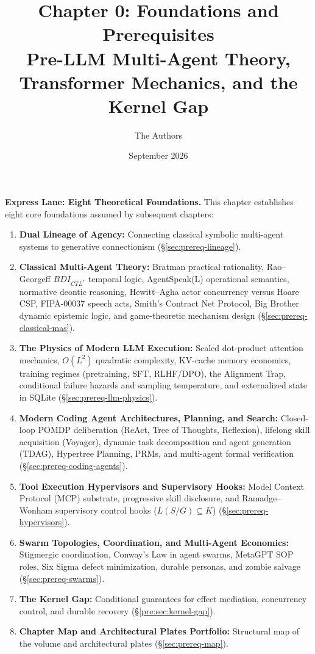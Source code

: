 \documentclass[11pt,a4paper]{article}
\title{\textbf{Chapter 0: Foundations and Prerequisites}\\
\large Pre-LLM Multi-Agent Theory, Transformer Mechanics, and the Kernel Gap}
\author{The Authors}
\date{September 2026}
\begin{document}
\maketitle


\noindent\textbf{Express Lane: Eight Theoretical Foundations.} This chapter establishes eight core foundations assumed by subsequent chapters:
\begin{enumerate}[leftmargin=1.8em,itemsep=3pt]
  \item \textbf{Dual Lineage of Agency:} Connecting classical symbolic multi-agent systems to generative connectionism (\S\ref{sec:prereq-lineage}).
  \item \textbf{Classical Multi-Agent Theory:} Bratman practical rationality, Rao--Georgeff $BDI_{CTL^*}$ temporal logic, AgentSpeak(L) operational semantics, normative deontic reasoning, Hewitt--Agha actor concurrency versus Hoare CSP, FIPA-00037 speech acts, Smith's Contract Net Protocol, Big Brother dynamic epistemic logic, and game-theoretic mechanism design (\S\ref{sec:prereq-classical-mas}).
  \item \textbf{The Physics of Modern LLM Execution:} Scaled dot-product attention mechanics, $O(L^2)$ quadratic complexity, KV-cache memory economics, training regimes (pretraining, SFT, RLHF/DPO), the Alignment Trap, conditional failure hazards and sampling temperature, and externalized state in SQLite (\S\ref{sec:prereq-llm-physics}).
  \item \textbf{Modern Coding Agent Architectures, Planning, and Search:} Closed-loop POMDP deliberation (ReAct, Tree of Thoughts, Reflexion), lifelong skill acquisition (Voyager), dynamic task decomposition and agent generation (TDAG), Hypertree Planning, PRMs, and multi-agent formal verification (\S\ref{sec:prereq-coding-agents}).
  \item \textbf{Tool Execution Hypervisors and Supervisory Hooks:} Model Context Protocol (MCP) substrate, progressive skill disclosure, and Ramadge--Wonham supervisory control hooks ($L(S/G) \subseteq K$) (\S\ref{sec:prereq-hypervisors}).
  \item \textbf{Swarm Topologies, Coordination, and Multi-Agent Economics:} Stigmergic coordination, Conway's Law in agent swarms, MetaGPT SOP roles, Six Sigma defect minimization, durable personas, and zombie salvage (\S\ref{sec:prereq-swarms}).
  \item \textbf{The Kernel Gap:} Conditional guarantees for effect mediation, concurrency control, and durable recovery (\S\ref{pre:sec:kernel-gap}).
  \item \textbf{Chapter Map and Architectural Plates Portfolio:} Structural map of the volume and architectural plates (\S\ref{sec:prereq-map}).
\end{enumerate}
\end{document}
